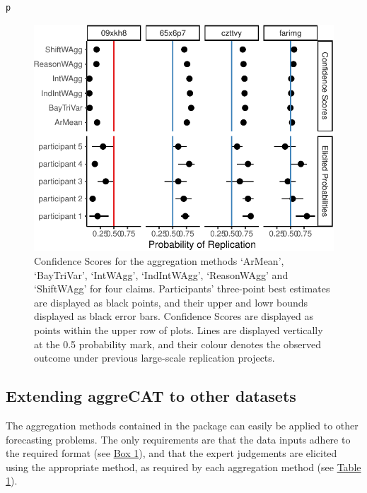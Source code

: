 \documentclass[article]{jss}
\begin{document}
\begin{verbatim}
p
\end{verbatim}

\begin{figure}[H]

{\centering \includegraphics{ms_files/figure-pdf/fig-aggregation-1.pdf}

}

\caption{\label{fig-aggregation}Confidence Scores for the aggregation
methods `ArMean', `BayTriVar', `IntWAgg', `IndIntWAgg', `ReasonWAgg' and
`ShiftWAgg' for four claims. Participants' three-point best estimates
are displayed as black points, and their upper and lowr bounds displayed
as black error bars. Confidence Scores are displayed as points within
the upper row of plots. Lines are displayed vertically at the 0.5
probability mark, and their colour denotes the observed outcome under
previous large-scale replication projects.}

\end{figure}

\hypertarget{extending-aggrecat-to-other-datasets}{%
\subsection{Extending aggreCAT to other
datasets}\label{extending-aggrecat-to-other-datasets}}

The aggregation methods contained in the  package can
easily be applied to other forecasting problems. The only requirements
are that the data inputs adhere to the required format (see
\protect\hyperlink{aggWorkflow}{Box 1}), and that the expert judgements
are elicited using the appropriate method, as required by each
aggregation method (see \protect\hyperlink{table1}{Table 1}).
\end{document}
